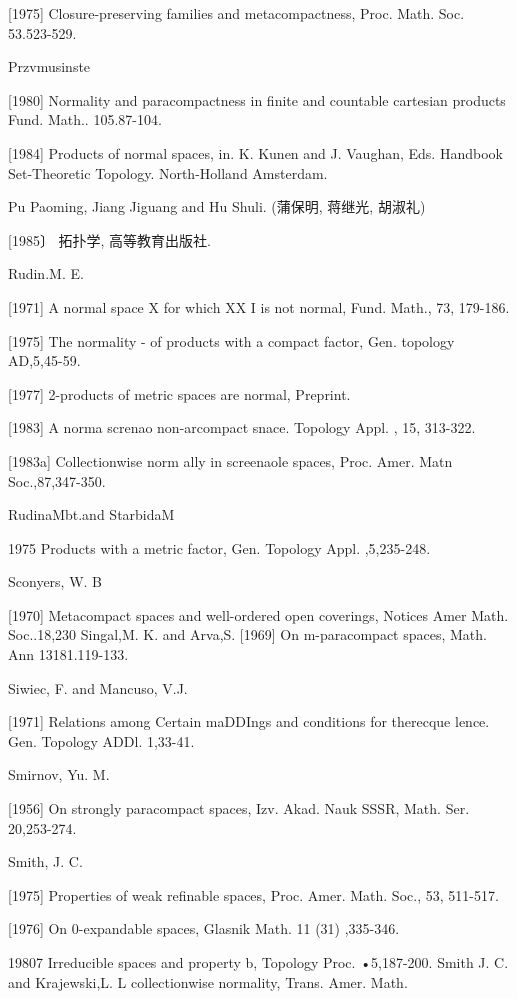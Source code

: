 \documentclass[main.tex]{subfiles}
\begin{document}
	[1975]%
	Closure-preserving
	families and metacompactness, Proc.
	Math. Soc.
	53.523-529.

\noindent Przvmusinste

	[1980]
	Normality and paracompactness in finite and countable cartesian
	products Fund. Math.. 105.87-104.

[1984]
	Products of normal spaces, in. K. Kunen and J. Vaughan, Eds.
	Handbook
	Set-Theoretic
	Topology.
	North-Holland
	Amsterdam.

\noindent Pu Paoming, Jiang Jiguang and Hu Shuli. (蒲保明, 蒋继光, 胡淑礼)
	
[1985〕 拓扑学, 高等教育出版社.

\noindent Rudin.M. E.

[1971]
	A normal space X for which XX I is not normal, Fund. Math., 73, 179-186.

[1975] The normality
	- of products with a compact
	factor, Gen. topology AD,5,45-59.

[1977]
	2-products of metric spaces are normal, Preprint.

[1983]
A norma screnao non-arcompact
snace. Topology
Appl. , 15,
313-322.

[1983a]
Collectionwise
norm
ally in screenaole spaces, Proc. Amer. Matn
Soc.,87,347-350.

\noindent RudinaMbt.and StarbidaM

1975 Products with a metric factor, Gen. Topology Appl. ,5,235-248.

\noindent Sconyers, W. B

[1970]
Metacompact spaces and well-ordered open coverings, Notices Amer
Math. Soc..18,230
Singal,M. K. and Arva,S.
[1969]
On m-paracompact spaces, Math. Ann
13181.119-133.

Siwiec, F. and Mancuso, V.J.

[1971]
Relations among
Certain maDDIngs and
conditions for therecque
lence. Gen. Topology ADDl. 1,33-41.

\noindent Smirnov, Yu. M.

[1956]
On strongly paracompact spaces, Izv. Akad. Nauk SSSR, Math. Ser.
20,253-274.

\noindent Smith, J. C.

[1975] Properties of weak refinable spaces, Proc. Amer. Math. Soc., 53,
511-517.

[1976] On 0-expandable spaces, Glasnik Math. 11 (31) ,335-346.

19807 Irreducible spaces and property b, Topology Proc.
•5,187-200.
Smith J. C. and Krajewski,L. L
collectionwise normality, Trans. Amer. Math.
\end{document}
